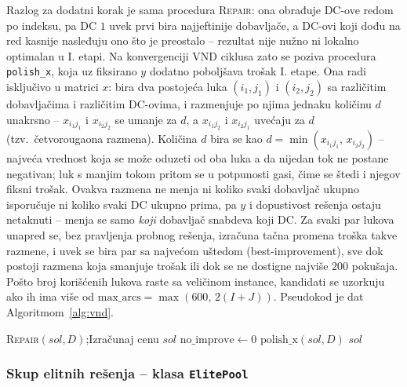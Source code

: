 \documentclass[12pt,a4paper]{article}
\begin{document}
Razlog za dodatni korak je sama procedura \textsc{Repair}: ona obrađuje
DC-ove redom po indeksu, pa DC $1$ uvek prvi bira najjeftinije dobavljače, a
DC-ovi koji dođu na red kasnije nasleđuju ono što je preostalo -- rezultat
nije nužno ni lokalno optimalan u I. etapi. Na konvergenciji VND ciklusa
zato se poziva procedura \texttt{polish\_x}, koja uz fiksirano $y$ dodatno
poboljšava trošak I. etape. Ona radi isključivo u matrici $x$: bira dva
postojeća luka $(i_1,j_1)$ i $(i_2,j_2)$ sa različitim dobavljačima i
različitim DC-ovima, i razmenjuje po njima jednaku količinu $d$ unakrsno --
$x_{i_1j_1}$ i $x_{i_2j_2}$ se umanje za $d$, a $x_{i_1j_2}$ i $x_{i_2j_1}$
uvećaju za $d$ (tzv.\ četvorougaona razmena). Količina $d$ bira se kao
$d = \min(x_{i_1j_1},\, x_{i_2j_2})$ -- najveća vrednost koja se može
oduzeti od oba luka a da nijedan tok ne postane negativan; luk s manjim
tokom pritom se u potpunosti gasi, čime se štedi i njegov fiksni trošak.
Ovakva razmena ne menja ni
koliko svaki dobavljač ukupno isporučuje ni koliko svaki DC ukupno prima, pa
$y$ i dopustivost rešenja ostaju netaknuti -- menja se samo \emph{koji}
dobavljač snabdeva koji DC. Za svaki par lukova unapred se, bez pravljenja
probnog rešenja, izračuna tačna promena troška takve razmene, i uvek se bira
par sa najvećom uštedom (best-improvement), sve dok postoji razmena koja
smanjuje trošak ili dok se ne dostigne najviše $200$ pokušaja. Pošto broj
korišćenih lukova raste sa veličinom instance, kandidati se uzorkuju ako ih
ima više od $\text{max\_arcs} = \max(600,\, 2(I+J))$. Pseudokod je dat
Algoritmom~\ref{alg:vnd}.

\begin{algorithm}[H]
\caption{VND$(D,\, sol,\, \text{allowed\_dc},\, \text{max\_no\_improve}=10)$}
\label{alg:vnd}
\SetAlgoLined
\textsc{Repair}$(sol, D)$;\quad Izračunaj cenu $sol$\;
$\text{no\_improve} \leftarrow 0$\;
$\text{polish\_x}(sol, D)$\;
\Return $sol$
\end{algorithm}

\subsubsection{Skup elitnih rešenja -- klasa \texttt{ElitePool}}
\end{document}
